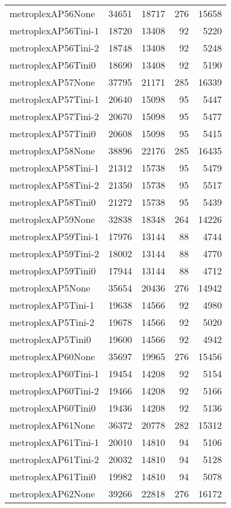 \begin{longtable}{lrrrr}
metroplexAP56None & 34651 & 18717 & 276 & 15658 \\
metroplexAP56Tini-1 & 18720 & 13408 & 92 & 5220 \\
metroplexAP56Tini-2 & 18748 & 13408 & 92 & 5248 \\
metroplexAP56Tini0 & 18690 & 13408 & 92 & 5190 \\
metroplexAP57None & 37795 & 21171 & 285 & 16339 \\
metroplexAP57Tini-1 & 20640 & 15098 & 95 & 5447 \\
metroplexAP57Tini-2 & 20670 & 15098 & 95 & 5477 \\
metroplexAP57Tini0 & 20608 & 15098 & 95 & 5415 \\
metroplexAP58None & 38896 & 22176 & 285 & 16435 \\
metroplexAP58Tini-1 & 21312 & 15738 & 95 & 5479 \\
metroplexAP58Tini-2 & 21350 & 15738 & 95 & 5517 \\
metroplexAP58Tini0 & 21272 & 15738 & 95 & 5439 \\
metroplexAP59None & 32838 & 18348 & 264 & 14226 \\
metroplexAP59Tini-1 & 17976 & 13144 & 88 & 4744 \\
metroplexAP59Tini-2 & 18002 & 13144 & 88 & 4770 \\
metroplexAP59Tini0 & 17944 & 13144 & 88 & 4712 \\
metroplexAP5None & 35654 & 20436 & 276 & 14942 \\
metroplexAP5Tini-1 & 19638 & 14566 & 92 & 4980 \\
metroplexAP5Tini-2 & 19678 & 14566 & 92 & 5020 \\
metroplexAP5Tini0 & 19600 & 14566 & 92 & 4942 \\
metroplexAP60None & 35697 & 19965 & 276 & 15456 \\
metroplexAP60Tini-1 & 19454 & 14208 & 92 & 5154 \\
metroplexAP60Tini-2 & 19466 & 14208 & 92 & 5166 \\
metroplexAP60Tini0 & 19436 & 14208 & 92 & 5136 \\
metroplexAP61None & 36372 & 20778 & 282 & 15312 \\
metroplexAP61Tini-1 & 20010 & 14810 & 94 & 5106 \\
metroplexAP61Tini-2 & 20032 & 14810 & 94 & 5128 \\
metroplexAP61Tini0 & 19982 & 14810 & 94 & 5078 \\
metroplexAP62None & 39266 & 22818 & 276 & 16172 \\

\end{longtable}
